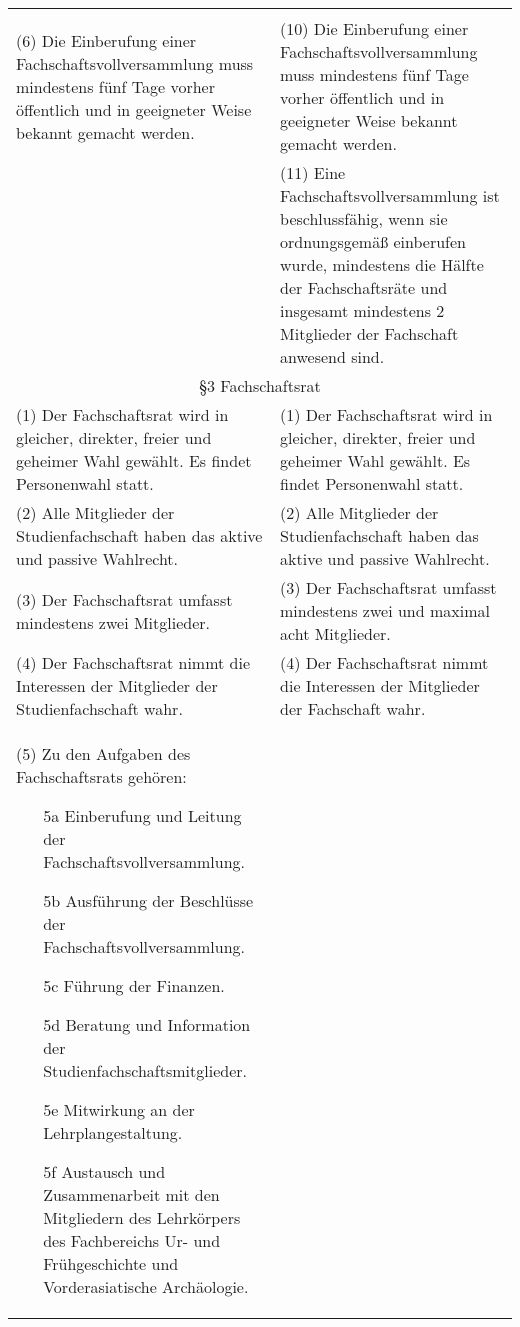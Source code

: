 {\begin{longtable}{|p{7.5cm}|p{7.5cm}|}
\begin{itemize}
        \end{itemize}\\
        (6) Die Einberufung einer Fachschaftsvollversammlung muss mindestens fünf Tage
        vorher öffentlich und in geeigneter Weise bekannt gemacht werden.&
        (10) Die Einberufung einer Fachschaftsvollversammlung muss mindestens fünf Tage
        vorher öffentlich und in geeigneter Weise bekannt gemacht werden.\\
        &(11) Eine Fachschaftsvollversammlung ist beschlussfähig, wenn sie ordnungsgemäß
        einberufen wurde, mindestens die Hälfte der Fachschaftsräte und insgesamt mindestens
        2 Mitglieder der Fachschaft anwesend sind.\\\hline
        \multicolumn{2}{|c|}{§3 Fachschaftsrat}\\\hline
        (1)  Der Fachschaftsrat wird in gleicher, direkter, freier und geheimer Wahl gewählt.
        Es findet Personenwahl statt.&(1)  Der Fachschaftsrat wird in gleicher, direkter, freier und geheimer Wahl gewählt.
        Es findet Personenwahl statt.\\
        (2)  Alle Mitglieder der Studienfachschaft haben das aktive und passive Wahlrecht.&(2)  Alle Mitglieder der Studienfachschaft haben das aktive und passive Wahlrecht.\\
        (3)  Der Fachschaftsrat umfasst mindestens zwei Mitglieder.&(3)  Der Fachschaftsrat umfasst mindestens zwei und maximal acht Mitglieder.\\
        (4)  Der Fachschaftsrat nimmt die Interessen der Mitglieder der Studienfachschaft wahr. & (4)  Der Fachschaftsrat nimmt die Interessen der Mitglieder der Fachschaft wahr.\\
        (5)  Zu den Aufgaben des Fachschaftsrats gehören:
        \begin{itemize}
        \item[5a]Einberufung und Leitung der Fachschaftsvollversammlung.
        \item[5b]Ausführung der Beschlüsse der Fachschaftsvollversammlung.
        \item[5c]Führung der Finanzen.
        \item[5d]Beratung und Information der Studienfachschaftsmitglieder.
        \item[5e]Mitwirkung an der Lehrplangestaltung.
        \item[5f]Austausch und Zusammenarbeit mit den Mitgliedern des Lehrkörpers des Fachbereichs Ur- und Frühgeschichte und Vorderasiatische Archäologie.    

\end{itemize}
\end{longtable}}
